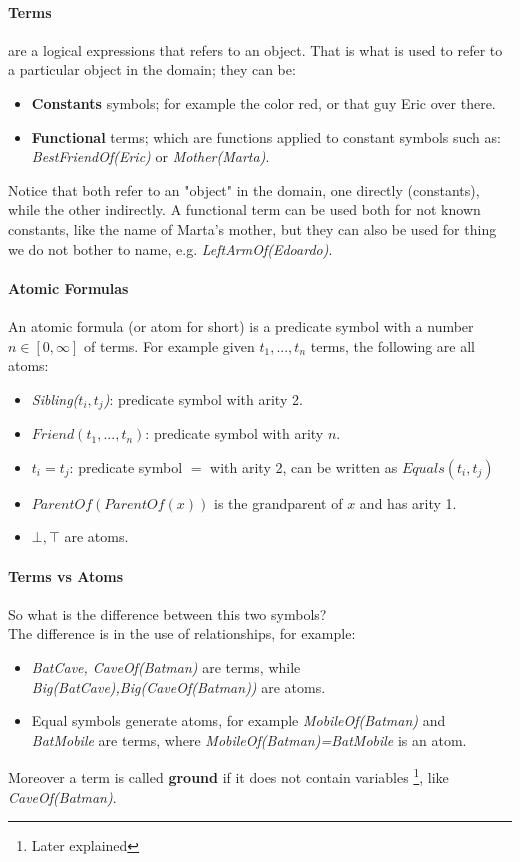 \documentclass[10pt,a4paper]{article}
\begin{document}
\paragraph{Terms}
are a logical expressions that refers to an object. That is what is used to refer to a particular object in the domain; they can be:
\begin{itemize}
\item \textbf{Constants} symbols; for example the color red, or that guy Eric over there.
\item \textbf{Functional} terms; which are functions applied to constant symbols such as: \textit{BestFriendOf(Eric)} or \textit{Mother(Marta)}.
\end{itemize}
Notice that both refer to an "object" in the domain, one directly (constants), while the other indirectly. A functional term can be used both for not known constants, like the name of Marta's mother, but they can also be used for thing we do not bother to name, e.g. \textit{LeftArmOf(Edoardo)}. 

\paragraph{Atomic Formulas}
An atomic formula (or atom for short) is a predicate symbol with a number $n\in [0,\infty]$ of terms. For example given $t_1,...,t_n$ terms, the following are all atoms:
\begin{itemize}
\item \textit{Sibling($t_i,t_j$)}:  predicate symbol with arity 2.
\item $Friend(t_1,...,t_n)$: predicate symbol with arity $n$.
\item $t_i=t_j$: predicate symbol $=$ with arity 2, can be written as $Equals(t_i,t_j)$
\item $ParentOf(ParentOf(x))$ is the grandparent of $x$ and has arity 1.
\item $\bot ,\top$ are atoms.
\end{itemize}

\paragraph{Terms vs Atoms}
So what is the difference between this two symbols?\\
The difference is in the use of relationships, for example:
\begin{itemize}
\item \textit{BatCave, CaveOf(Batman)} are terms, while \textit{Big(BatCave),Big(CaveOf(Batman))} are atoms.
\item Equal symbols generate atoms, for example \textit{MobileOf(Batman)} and \textit{BatMobile} are terms, where \textit{MobileOf(Batman)=BatMobile} is an atom.
\end{itemize}
Moreover a term is called \textbf{ground} if it does not contain variables \footnote{Later explained}, like \textit{CaveOf(Batman)}.
\end{document}
